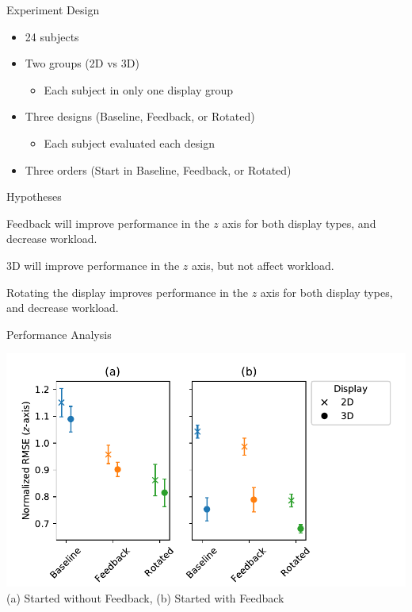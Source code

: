 \documentclass[10pt]{beamer}
\begin{document}
\begin{frame}[fragile]{Experiment Design}
  \begin{itemize}
    \setlength\itemsep{1em}
    \item 24 subjects
    \item Two groups (2D vs 3D)
    \begin{itemize}
      \item Each subject in only one display group
    \end{itemize}
    \item Three designs (Baseline, Feedback, or Rotated)
    \begin{itemize}
      \item Each subject evaluated each design
    \end{itemize}
    \item Three orders (Start in Baseline, Feedback, or Rotated)
  \end{itemize}
\end{frame}

\begin{frame}[fragile]{Hypotheses}
  \begin{description}[align=left]
    \item [H1] Feedback will improve performance in the $z$ axis for both display types, and decrease workload.
    \item [H2] 3D will improve performance in the $z$ axis, but not affect workload.
    \item [H3] Rotating the display improves performance in the $z$ axis for both display types, and decrease workload.
  \end{description}
\end{frame}

\begin{frame}[fragile]{Performance Analysis}
  \begin{center}
    \includegraphics[width=\linewidth]{../img/x_design_y_zrmse_hue_device_col_cbf_first.pdf}\\
    (a) Started without Feedback, (b) Started with Feedback
  \end{center}
\end{frame}
\end{document}

